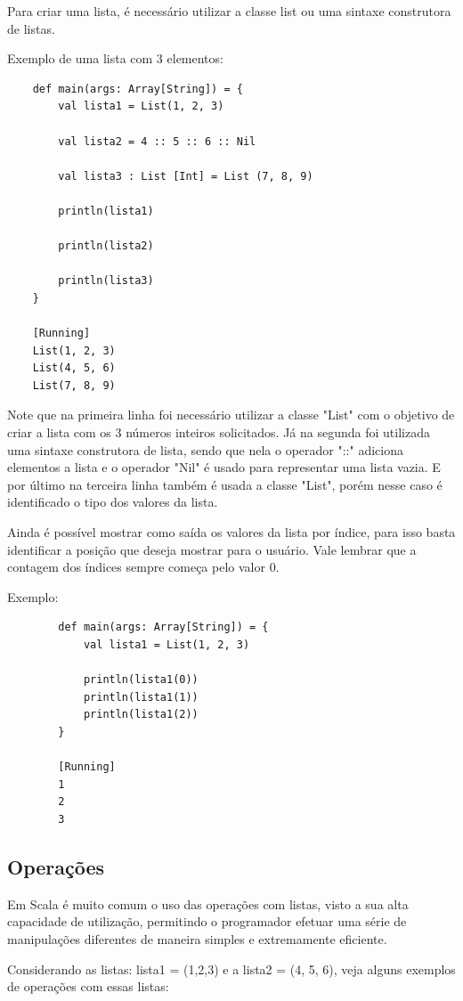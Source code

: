 	Para criar uma lista, é necessário utilizar a classe list ou uma sintaxe construtora de listas.
	
	Exemplo de uma lista com 3 elementos:
	
	\begin{lstlisting}
	def main(args: Array[String]) = {
		val lista1 = List(1, 2, 3)
	
		val lista2 = 4 :: 5 :: 6 :: Nil
	
		val lista3 : List [Int] = List (7, 8, 9)
	
		println(lista1)
	
		println(lista2)
	
		println(lista3)
	}

	[Running] 
	List(1, 2, 3)
	List(4, 5, 6)
	List(7, 8, 9)
	\end{lstlisting}
	
	Note que na primeira linha foi necessário utilizar a classe "List" com o objetivo de criar a lista com os 3 números inteiros solicitados. Já na segunda foi utilizada uma sintaxe construtora de lista, sendo que nela o operador "::" adiciona elementos a lista e o operador "Nil" é usado para representar uma lista vazia. E por último na terceira linha também é usada a classe "List", porém nesse caso é identificado o tipo dos valores da lista.
	
	Ainda é possível mostrar como saída os valores da lista por índice, para isso basta identificar a posição que deseja mostrar para o usuário. Vale lembrar que a contagem dos índices sempre começa pelo valor 0.
	
	Exemplo:
	\begin{lstlisting}
		def main(args: Array[String]) = {
			val lista1 = List(1, 2, 3)
			
			println(lista1(0))
			println(lista1(1))
			println(lista1(2))
		}
	
		[Running] 
		1
		2
		3
	\end{lstlisting}

	\subsection{Operações}
	
	Em Scala é muito comum o uso das operações com listas, visto a sua alta capacidade de utilização, permitindo o programador efetuar uma série de manipulações diferentes de maneira simples e extremamente eficiente.
	
	Considerando as listas: lista1 = (1,2,3) e a lista2 = (4, 5, 6), veja alguns exemplos de operações com essas listas:
	
